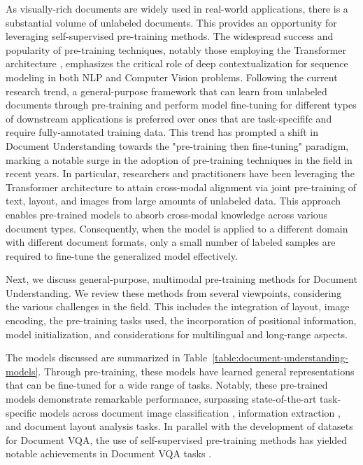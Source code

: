 As visually-rich documents are widely used in real-world applications, there is a substantial volume of unlabeled documents. This provides an opportunity for leveraging self-supervised pre-training methods. The widespread success and popularity of pre-training techniques, notably those employing the Transformer architecture \citep{vaswani2017attention}, emphasizes the critical role of deep contextualization for sequence modeling in both \ac{NLP} and Computer Vision problems. Following the current research trend, a general-purpose framework that can learn from unlabeled documents through pre-training and perform model fine-tuning for different types of downstream applications is preferred over ones that are task-specififc and require fully-annotated training data. This trend has prompted a shift in Document Understanding towards the "pre-training then fine-tuning" paradigm, marking a notable surge in the adoption of pre-training techniques in the field in recent years. In particular, researchers and practitioners have been leveraging the Transformer architecture to attain cross-modal alignment via joint pre-training of text, layout, and images from large amounts of unlabeled data. This approach enables pre-trained models to absorb cross-modal knowledge across various document types. Consequently, when the model is applied to a different domain with different document formats, only a small number of labeled samples are required to fine-tune the generalized model effectively. 

Next, we discuss general-purpose, multimodal pre-training methods for Document Understanding. We review these methods from several viewpoints, considering the various challenges in the field. This includes the integration of layout, image encoding, the pre-training tasks used, the incorporation of positional information, model initialization, and considerations for multilingual and long-range aspects. 

The models discussed are summarized in Table~\ref{table:document-understanding-models}. Through pre-training, these models have learned general representations that can be fine-tuned for a wide range of tasks. Notably, these pre-trained models demonstrate remarkable performance, surpassing state-of-the-art task-specific models across document image classification \citep{xu2020layoutlmv2}, information extraction \citep{peng2022ernie}, and document layout analysis \citep{li2020docbank} tasks. In parallel with the development of datasets for {Document VQA}, the use of self-supervised pre-training methods has yielded notable achievements in {Document VQA} tasks \citep{appalaraju2021docformer, tanaka2021visualmrc}. 

